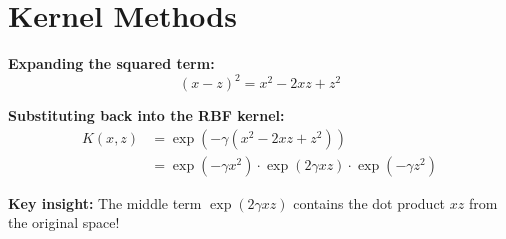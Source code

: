 \documentclass{beamer}
\begin{document}

\section{Kernel Methods}

{
	
}

\begin{frame}\textbf{Expanding the squared term:}
	$$(x - z)^{2} = x^{2} - 2xz + z^{2}$$
	
	\pause
	\textbf{Substituting back into the RBF kernel:}
	\begin{align*}
	K(x, z) &= \exp(-\gamma(x^{2}-2xz+z^{2})) \\
	&= \exp(-\gamma x^{2}) \cdot \exp(2\gamma xz) \cdot \exp(-\gamma z^{2})
	\end{align*}
	
	\textbf{Key insight:} The middle term $\exp(2\gamma xz)$ contains the dot product $xz$ from the original space!
	\end{frame}
	
\end{document}

